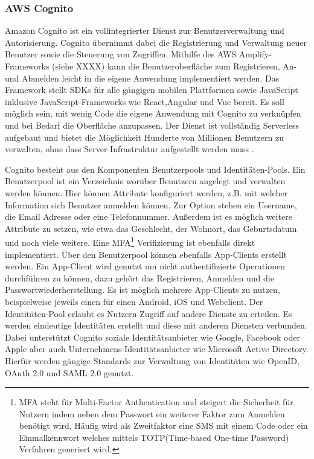 {\subsubsection{AWS Cognito}
\label{Cognito}
Amazon Cognito ist ein vollintegrierter Dienst zur Benutzerverwaltung und Autorisierung.
Cognito übernimmt dabei die Registrierung und Verwaltung neuer Benutzer sowie die Steuerung von Zugriffen.
Mithilfe des AWS Amplify-Frameworks (siehe XXXX) kann die Benutzeroberfläche zum Registrieren, An- und Abmelden leicht in die eigene Anwendung implementiert werden.
Das Framework stellt SDKs für alle gängigen mobilen Plattformen sowie JavaScript inklusive JavaScript-Frameworks wie React,Angular und Vue bereit.
Es soll möglich sein, mit wenig Code die eigene Anwendung mit Cognito zu verknüpfen und bei Bedarf die Oberfläche anzupassen.
Der Dienst ist vollständig Serverless aufgebaut und bietet die Möglichkeit \glqq Hunderte von Millionen Benutzern\grqq{} zu verwalten,
\glqq ohne dass Server-Infrastruktur aufgestellt werden muss\grqq{} \cite[]{CognitoUebersicht}. \cite[]{Cognito2}

Cognito besteht aus den Komponenten Benutzerpools und Identitäten-Pools.
Ein Benutzerpool ist ein Verzeichnis worüber Benutzern angelegt und verwalten werden können. Hier können Attribute konfiguriert werden, z.B.
mit welcher Information sich Benutzer anmelden können.
Zur Option stehen ein Username, die Email Adresse oder eine Telefonnummer. Außerdem ist es möglich weitere Attribute zu setzen, wie etwa das Geschlecht, der Wohnort,
das Geburtsdatum und noch viele weitere.
Eine MFA\footnote{MFA steht für Multi-Factor Authentication und steigert die Sicherheit für Nutzern indem neben dem Passwort
ein weiterer Faktor zum Anmelden benötigt wird. Häufig wird als Zweitfaktor eine SMS mit einem Code oder
ein Einmalkennwort welches mittels TOTP(Time-based One-time Password) Verfahren generiert wird. } Verifizierung ist ebenfalls direkt implementiert.
Über den Benutzerpool können ebenfalls App-Clients erstellt werden.
Ein App-Client wird genutzt um nicht authentifizierte Operationen durchführen zu können, dazu gehört das Registrieren, Anmelden und die Passwortwiederherstellung.
Es ist möglich mehrere App-Clients zu nutzen, beispielweise jeweils einen für einen Android, iOS und Webclient.
Der Identitäten-Pool erlaubt es Nutzern Zugriff auf andere Dienste zu erteilen. Es werden eindeutige Identitäten erstellt und diese
mit anderen Diensten verbunden. Dabei unterstützt Cognito soziale Identitätsanbieter wie Google, Facebook oder Apple aber auch
Unternehmens-Identitätsanbieter wie Microsoft Active Directory.
Hierfür werden gängige Standards zur Verwaltung von Identitäten wie OpenID, OAuth 2.0 und SAML 2.0 genutzt. \cite[]{Cognito1}

}
